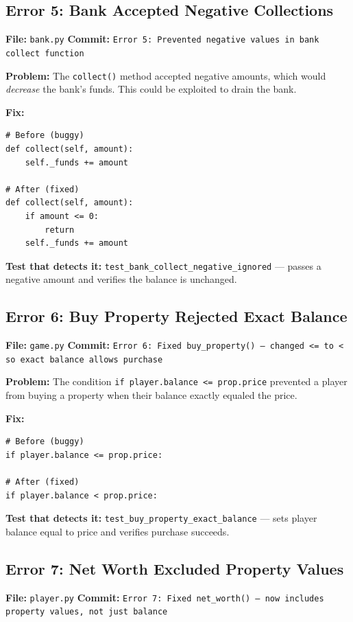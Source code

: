 \documentclass[12pt,a4paper]{article}
\begin{document}

\subsection{Error 5: Bank Accepted Negative Collections}
\textbf{File:} \texttt{bank.py} \quad \textbf{Commit:} \texttt{Error 5: Prevented negative values in bank collect function}

\textbf{Problem:} The \texttt{collect()} method accepted negative amounts, which would \textit{decrease} the bank's funds. This could be exploited to drain the bank.

\textbf{Fix:}
\begin{lstlisting}
# Before (buggy)
def collect(self, amount):
    self._funds += amount

# After (fixed)
def collect(self, amount):
    if amount <= 0:
        return
    self._funds += amount
\end{lstlisting}

\textbf{Test that detects it:} \texttt{test\_bank\_collect\_negative\_ignored} --- passes a negative amount and verifies the balance is unchanged.


\subsection{Error 6: Buy Property Rejected Exact Balance}
\textbf{File:} \texttt{game.py} \quad \textbf{Commit:} \texttt{Error 6: Fixed buy\_property() --- changed <= to < so exact balance allows purchase}

\textbf{Problem:} The condition \texttt{if player.balance <= prop.price} prevented a player from buying a property when their balance exactly equaled the price.

\textbf{Fix:}
\begin{lstlisting}
# Before (buggy)
if player.balance <= prop.price:

# After (fixed)
if player.balance < prop.price:
\end{lstlisting}

\textbf{Test that detects it:} \texttt{test\_buy\_property\_exact\_balance} --- sets player balance equal to price and verifies purchase succeeds.


\subsection{Error 7: Net Worth Excluded Property Values}
\textbf{File:} \texttt{player.py} \quad \textbf{Commit:} \texttt{Error 7: Fixed net\_worth() --- now includes property values, not just balance}
\end{document}
